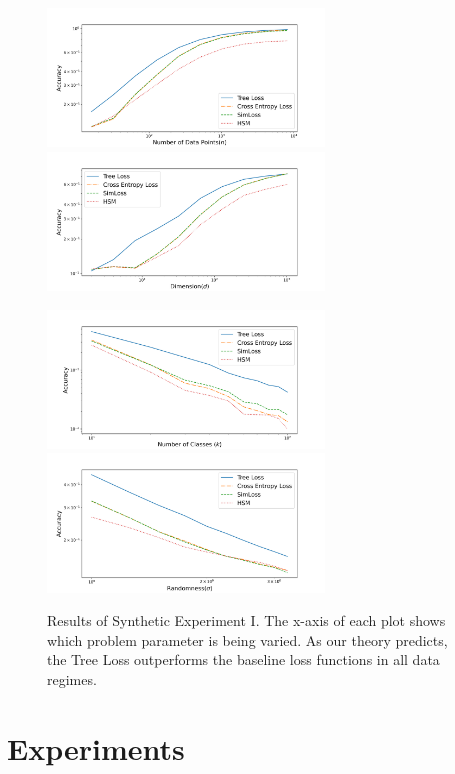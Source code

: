 \documentclass[twoside]{article}
\begin{document}
\begin{figure}
    \centering 

\includegraphics[width=\columnwidth,height=1.45in]{fig/images/accuracy_vs_n.png}
\includegraphics[width=\columnwidth,height=1.45in]{fig/images/accuracy_vs_d.png}

\includegraphics[width=\columnwidth,height=1.45in]{fig/images/accuracy_vs_class.png}
\includegraphics[width=\columnwidth,height=1.45in]{fig/images/accuracy_vs_sigma.png}
\caption{
    Results of Synthetic Experiment I.
    The x-axis of each plot shows which problem parameter is being varied.
    As our theory predicts, the Tree Loss outperforms the baseline loss functions in all data regimes.
}
\label{fig:synth:1}
\end{figure}

\section{Experiments}
\label{sec:experiment}
\end{document}
